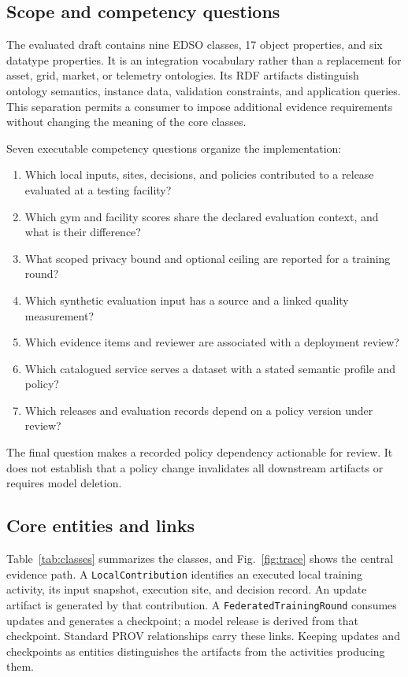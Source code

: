 \documentclass[conference]{IEEEtran}
\newcommand{\term}[1]{\texttt{#1}}
\begin{document}
\subsection{Scope and competency questions}
The evaluated draft contains nine EDSO classes, 17 object properties, and six datatype properties. It is an integration vocabulary rather than a replacement for asset, grid, market, or telemetry ontologies. Its RDF artifacts distinguish ontology semantics, instance data, validation constraints, and application queries. This separation permits a consumer to impose additional evidence requirements without changing the meaning of the core classes.

Seven executable competency questions organize the implementation:
\begin{enumerate}
\item Which local inputs, sites, decisions, and policies contributed to a release evaluated at a testing facility?
\item Which gym and facility scores share the declared evaluation context, and what is their difference?
\item What scoped privacy bound and optional ceiling are reported for a training round?
\item Which synthetic evaluation input has a source and a linked quality measurement?
\item Which evidence items and reviewer are associated with a deployment review?
\item Which catalogued service serves a dataset with a stated semantic profile and policy?
\item Which releases and evaluation records depend on a policy version under review?
\end{enumerate}
The final question makes a recorded policy dependency actionable for review. It does not establish that a policy change invalidates all downstream artifacts or requires model deletion.

\subsection{Core entities and links}
Table~\ref{tab:classes} summarizes the classes, and Fig.~\ref{fig:trace} shows the central evidence path. A \term{LocalContribution} identifies an executed local training activity, its input snapshot, execution site, and decision record. An update artifact is generated by that contribution. A \term{FederatedTrainingRound} consumes updates and generates a checkpoint; a model release is derived from that checkpoint. Standard PROV relationships carry these links. Keeping updates and checkpoints as entities distinguishes the artifacts from the activities producing them.
\end{document}
